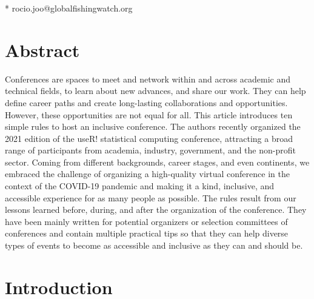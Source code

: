 \documentclass[10pt,letterpaper]{article}
\begin{document}
\begin{flushleft}


* rocio.joo@globalfishingwatch.org

\end{flushleft}
\section*{Abstract}

Conferences are spaces to meet and network within and across academic and technical fields, to learn about new advances, and share our work. They can help define career paths and create long-lasting collaborations and opportunities. 
However, these opportunities are not equal for all. 
This article introduces ten simple rules to host an inclusive conference. 
The authors recently organized the 2021 edition of the useR! statistical computing conference, attracting a broad range of participants from academia, industry, government, and the non-profit sector. 
Coming from different backgrounds, career stages, and even continents, we embraced the challenge of organizing a high-quality virtual conference in the context of the COVID-19 pandemic and making it a kind, inclusive, and accessible experience for as many people as possible.
The rules result from our lessons learned before, during, and after the organization of the conference. 
They have been mainly written for potential organizers or selection committees of conferences and contain multiple practical tips so that they can help diverse types of events to become as accessible and inclusive as they can and should be.



\linenumbers

\section*{Introduction}
\end{document}
